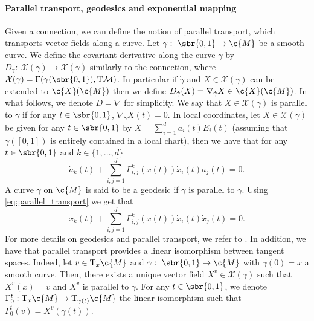 \paragraph{Parallel transport, geodesics and exponential mapping}
Given a connection, we can define the notion of parallel transport, which transports vector fields along a curve.
Let \(\gamma: \ \sbr{0,1} \to \c{M}\) be a smooth curve.
We define the covariant derivative along the curve \(\gamma\) by \(D_{\dot{\gamma}}: \ \mathcal{X}(\gamma) \to \mathcal{X}(\gamma)\) similarly to the connection, where \(\mathcal{X}(\gamma) = \Gamma(\gamma(\sbr{0,1}), \TM)\).
In particular if \(\dot{\gamma}\) and \(X \in \mathcal{X}(\gamma)\) can be extended to \(\c{X}(\c{M})\) then we define \(D_{\dot{\gamma}}(X) = \nabla_{\dot{\gamma}}X \in \c{X}(\c{M})\).
In what follows, we denote \(D = \nabla\) for simplicity.
We say that \(X \in \mathcal{X}(\gamma)\) is parallel to \(\gamma\) if for any \(t \in \sbr{0,1}\), \(\nabla_{\dot{\gamma}}X(t) = 0\).
In local coordinates, let \(X \in \mathcal{X}(\gamma)\) be given for any \(t \in \sbr{0,1}\) by \(X = \sum_{i=1}^d a_i(t) E_i(t)\) (assuming that \(\gamma([0,1])\) is entirely contained in a local chart), then we have that for any \(t \in \sbr{0,1}\) and \(k \in \{1, \dots, d\}\) \begin{equation} \label{eq:parallel_transport} {\dot{a}_k(t) + \sum_{i,j=1}^d \Gamma_{i,j}^k(x(t)) \dot{x}_i(t) a_j(t) = 0 .
	}
\end{equation}
A curve \(\gamma\) on \(\c{M}\) is said to be a geodesic if \(\dot{\gamma}\) is parallel to \(\gamma\).
Using \cref{eq:parallel_transport} we get that \begin{equation} \label{eq:geodesics} {\ddot{x}_k(t) + \sum_{i,j=1}^d \Gamma_{i,j}^k(x(t)) \dot{x}_i(t) \dot{x}_j(t) = 0 .
	}
\end{equation}
For more details on geodesics and parallel transport, we refer to \textcite[Chapter 4]{lee2018introduction}.
In addition, we have that parallel transport provides a linear isomorphism between tangent spaces.
Indeed, let \(v \in \mathrm{T}_x \c{M}\) and \(\gamma: \ \sbr{0,1} \to \c{M}\) with \(\gamma(0) = x\) a smooth curve.
Then, there exists a unique vector field \(X^v \in \mathcal{X}(\gamma)\) such that \(X^v(x) = v\) and \(X^v\) is parallel to \(\gamma\).
For any \(t \in \sbr{0,1}\), we denote \(\Gamma_0^t: \mathrm{T}_{x} \c{M} \to \mathrm{T}_{\gamma(t)} \c{M}\) the linear isomorphism such that \(\Gamma_0^t(v) = X^v(\gamma(t))\).


